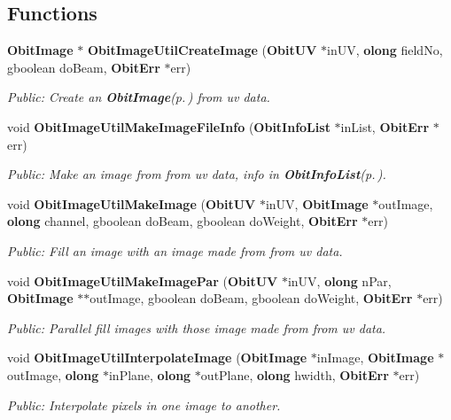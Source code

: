 \subsection*{Functions}
\begin{CompactItemize}
\item 
{\bf Obit\-Image} $\ast$ {\bf Obit\-Image\-Util\-Create\-Image} ({\bf Obit\-UV} $\ast$in\-UV, {\bf olong} field\-No, gboolean do\-Beam, {\bf Obit\-Err} $\ast$err)
\begin{CompactList}\small\item\em Public: Create an {\bf Obit\-Image}{\rm (p.\,\pageref{structObitImage})} from uv data. \item\end{CompactList}\item 
void {\bf Obit\-Image\-Util\-Make\-Image\-File\-Info} ({\bf Obit\-Info\-List} $\ast$in\-List, {\bf Obit\-Err} $\ast$err)
\begin{CompactList}\small\item\em Public: Make an image from from uv data, info in {\bf Obit\-Info\-List}{\rm (p.\,\pageref{structObitInfoList})}. \item\end{CompactList}\item 
void {\bf Obit\-Image\-Util\-Make\-Image} ({\bf Obit\-UV} $\ast$in\-UV, {\bf Obit\-Image} $\ast$out\-Image, {\bf olong} channel, gboolean do\-Beam, gboolean do\-Weight, {\bf Obit\-Err} $\ast$err)
\begin{CompactList}\small\item\em Public: Fill an image with an image made from from uv data. \item\end{CompactList}\item 
void {\bf Obit\-Image\-Util\-Make\-Image\-Par} ({\bf Obit\-UV} $\ast$in\-UV, {\bf olong} n\-Par, {\bf Obit\-Image} $\ast$$\ast$out\-Image, gboolean do\-Beam, gboolean do\-Weight, {\bf Obit\-Err} $\ast$err)
\begin{CompactList}\small\item\em Public: Parallel fill images with those image made from from uv data. \item\end{CompactList}\item 
void {\bf Obit\-Image\-Util\-Interpolate\-Image} ({\bf Obit\-Image} $\ast$in\-Image, {\bf Obit\-Image} $\ast$out\-Image, {\bf olong} $\ast$in\-Plane, {\bf olong} $\ast$out\-Plane, {\bf olong} hwidth, {\bf Obit\-Err} $\ast$err)
\begin{CompactList}\small\item\em Public: Interpolate pixels in one image to another. \item\end{CompactList}\item 
$$
\end{CompactItemize}
